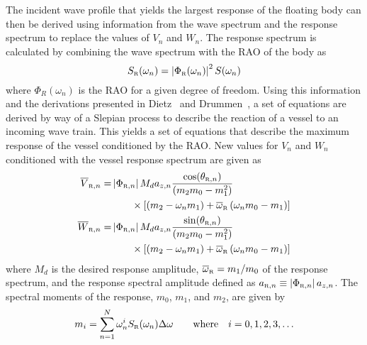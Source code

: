 The incident wave profile that yields the largest response of the floating body can then be derived using information from the wave spectrum and the response spectrum to replace the values of $V_n$ and $W_n$.  The response spectrum is calculated by combining the wave spectrum with the RAO of the body as
\begin{equation}
S_{\text{\tiny{R}}}(\omega_n) = \left| \Phi_{\text{\tiny{R}}}(\omega_n) \right| ^2 S(\omega_n)
\label{eq:S_RAO}
\end{equation}
where $\Phi_R(\omega_n)$ is the RAO for a given degree of freedom.
Using this information and the derivations presented in Dietz~\cite{Dietz2004} and Drummen~\cite{Drummen2008}, a set of equations are derived by way of a Slepian process to describe the reaction of a vessel to an incoming wave train.  This yields a set of equations that describe the maximum response of the vessel conditioned by the RAO.  New values for $V_n$ and $W_n$ conditioned with the vessel response spectrum are given as
\begin{align}
\overline{V}_{\text{\tiny{R}},n} = 
        &\left|\Phi_{\text{\tiny{R}},n}\right| M_d a_{z,n} 
               \frac{\cos(\theta_{\text{\tiny{R}},n})}{\left(m_2 m_0 -m_1^2\right)}\nonumber\\
        &\qquad\times\left[ \left(m_2 - \omega_n m_1 \right) + \overline{\omega}_{\text{\tiny{R}}} \left( \omega_n m_0 - m_1 \right) \right]\label{eq:drummen23_rev}\\
\overline{W}_{\text{\tiny{R}},n} = 
		&\left|\Phi_{\text{\tiny{R}},n}\right| M_d a_{z,n}
               \frac{\sin(\theta_{\text{\tiny{R}},n})}{\left(m_2 m_0 -m_1^2\right)}\nonumber\\
        &\qquad\times\left[ \left(m_2 - \omega_n m_1 \right) + \overline{\omega}_{\text{\tiny{R}}} \left( \omega_n m_0 - m_1 \right) \right]\label{eq:drummen24_rev}
\end{align}
where $M_d$ is the desired response amplitude, $\overline{\omega}_{\text{\tiny{R}}} = m_1/m_0$ of the response spectrum, and the response spectral amplitude defined as $a_{\text{\tiny{R}},n} \equiv \left|\Phi_{\text{\tiny{R}},n}\right| a_{z,n}$.  The spectral moments of the response, $m_0$, $m_1$, and $m_2$, are given by 
\begin{equation}
m_i = \sum_{n=1}^{N} \omega_n^i S_{\text{\tiny{R}}}(\omega_n) \Delta\omega \qquad \text{where} \quad i = 0, 1, 2, 3, \ldots
\label{eq:spect_mom}
\end{equation}


